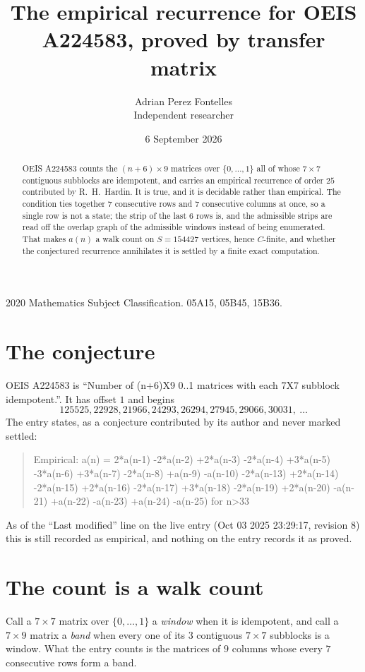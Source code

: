 \documentclass[11pt,a4paper]{article}
\title{The empirical recurrence for OEIS A224583, proved by transfer matrix}
\author{Adrian Perez Fontelles\\ \small Independent researcher}
\date{6 September 2026}
\theoremstyle{plain}
\theoremstyle{definition}
\begin{document}
\maketitle

\begin{abstract}
OEIS A224583 counts the $(n+6)\times9$ matrices over $\{0,\dots,1\}$ all of whose
$7\times7$ contiguous subblocks are idempotent, and carries an empirical recurrence of order
$25$ contributed by R.~H.~Hardin. It is true, and it is decidable rather than empirical.
The condition ties together $7$ consecutive rows and $7$ consecutive columns at once, so a
single row is not a state; the strip of the last $6$ rows is, and the admissible strips
are read off the overlap graph of the admissible windows instead of being enumerated. That
makes $a(n)$ a walk count on $S=154427$ vertices, hence $C$-finite, and whether the conjectured
recurrence annihilates it is settled by a finite exact computation.
\end{abstract}

\noindent\small 2020 Mathematics Subject Classification. 05A15, 05B45, 15B36.\normalsize

\section{The conjecture}

OEIS A224583 is ``Number of (n+6)X9 0..1 matrices with each 7X7 subblock idempotent.''. It has offset $1$ and begins
\[
125525, 22928, 21966, 24293, 26294, 27945, 29066, 30031,\ \dots
\]
The entry states, as a conjecture contributed by its author and never marked settled:
\begin{quote}
Empirical: a(n) = 2*a(n-1) -2*a(n-2) +2*a(n-3) -2*a(n-4) +3*a(n-5) -3*a(n-6) +3*a(n-7) -2*a(n-8) +a(n-9) -a(n-10) -2*a(n-13) +2*a(n-14) -2*a(n-15) +2*a(n-16) -2*a(n-17) +3*a(n-18) -2*a(n-19) +2*a(n-20) -a(n-21) +a(n-22) -a(n-23) +a(n-24) -a(n-25) for n>33
\end{quote}
As of the ``Last modified'' line on the live entry (Oct 03 2025 23:29:17, revision 8) this is still
recorded as empirical, and nothing on the entry records it as proved.

\section{The count is a walk count}

Call a $7\times7$ matrix over $\{0,\dots,1\}$ a \emph{window} when it is idempotent, and
call a $7\times9$ matrix a \emph{band} when every one of its $3$ contiguous
$7\times7$ subblocks is a window. What the entry counts is the matrices of $9$ columns
whose every $7$ consecutive rows form a band.
\end{document}
